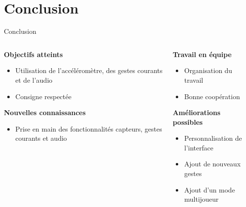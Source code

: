 \documentclass[xcolor=dvipsnames]{beamer}
\begin{document}
\section{Conclusion}

\begin{frame}{Conclusion}
    \begin{columns}[T]
    \begin{column}[c]{6cm}
        \textbf{Objectifs atteints}
        \begin{itemize}[label=]
            \item Utilisation de l'accéléromètre, des gestes courants et de l'audio
            \item Consigne respectée
        \end{itemize}
        \vspace{3em}
        \textbf{Nouvelles connaissances}
        \begin{itemize}[label=]
            \item Prise en main des fonctionnalités capteurs, gestes courants et audio
        \end{itemize}
    \end{column}
    \begin{column}[c]{6cm}
        \textbf{Travail en équipe}
        \begin{itemize}[label=]
            \item Organisation du travail
            \item Bonne coopération
        \end{itemize}
        \vspace{3em}
        \textbf{Améliorations possibles}
        \begin{itemize}[label=]
            \item Personnalisation de l'interface
            \item Ajout de nouveaux gestes
            \item Ajout d'un mode multijoueur
        \end{itemize}
    \end{column}
    \end{columns}
\end{frame}
\end{document}
